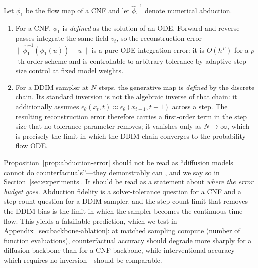 \begin{proposition}
\label{prop:abduction-error}
Let $\phi_1$ be the flow map of a CNF and let $\hat\phi_1^{-1}$ denote numerical abduction.
\begin{enumerate}
  \item For a CNF, $\phi_1$ is \emph{defined} as the solution of an ODE. Forward and reverse
  passes integrate the same field $v_t$, so the reconstruction error
  $\|\hat\phi_1^{-1}(\phi_1(u)) - u\|$ is a pure ODE integration error: it is $O(h^{\,p})$
  for a $p$-th order scheme and is controllable to arbitrary tolerance by adaptive step-size
  control at fixed model weights.
  \item For a DDIM sampler at $N$ steps, the generative map is \emph{defined} by the discrete
  chain. Its standard inversion is not the algebraic inverse of that chain: it additionally
  assumes $\epsilon_\theta(x_t,t) \approx \epsilon_\theta(x_{t-1},t-1)$ across a step. The
  resulting reconstruction error therefore carries a first-order term in the step size that
  no tolerance parameter removes; it vanishes only as $N \to \infty$, which is precisely the
  limit in which the DDIM chain converges to the probability-flow ODE.
\end{enumerate}
\end{proposition}

\begin{remark}[Interpretation]
\label{rem:inversion-interp}
Proposition~\ref{prop:abduction-error} should not be read as ``diffusion models cannot do
counterfactuals''---they demonstrably can \citep{sanchez2022diffusion, chao2023interventional},
and we say so in Section~\ref{sec:experiments}. It should be read as a statement about
\emph{where the error budget goes}. Abduction fidelity is a solver-tolerance question for a
CNF and a step-count question for a DDIM sampler, and the step-count limit that removes the
DDIM bias is the limit in which the sampler becomes the continuous-time flow. This yields a
falsifiable prediction, which we test in Appendix~\ref{sec:backbone-ablation}: at matched
sampling compute (number of function evaluations), counterfactual accuracy should degrade
more sharply for a diffusion backbone than for a CNF backbone, while interventional accuracy
---which requires no inversion---should be comparable.
\end{remark}
